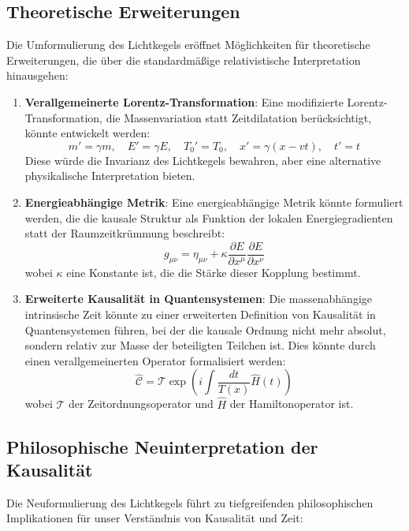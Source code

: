 \documentclass[a4paper,12pt]{article}
\newcommand{\Tfield}{T(x)}
\begin{document}
	\subsection{Theoretische Erweiterungen}
	Die Umformulierung des Lichtkegels eröffnet Möglichkeiten für theoretische Erweiterungen, die über die standardmäßige relativistische Interpretation hinausgehen:
	\begin{enumerate}
		\item \textbf{Verallgemeinerte Lorentz-Transformation}: Eine modifizierte Lorentz-Transformation, die Massenvariation statt Zeitdilatation berücksichtigt, könnte entwickelt werden:
		\begin{equation}
			m' = \gamma m, \quad E' = \gamma E, \quad T_0' = T_0, \quad x' = \gamma(x - vt), \quad t' = t
		\end{equation}
		Diese würde die Invarianz des Lichtkegels bewahren, aber eine alternative physikalische Interpretation bieten.
		\item \textbf{Energieabhängige Metrik}: Eine energieabhängige Metrik könnte formuliert werden, die die kausale Struktur als Funktion der lokalen Energiegradienten statt der Raumzeitkrümmung beschreibt:
		\begin{equation}
			g_{\mu\nu} = \eta_{\mu\nu} + \kappa \frac{\partial E}{\partial x^\mu}\frac{\partial E}{\partial x^\nu}
		\end{equation}
		wobei \( \kappa \) eine Konstante ist, die die Stärke dieser Kopplung bestimmt.
		\item \textbf{Erweiterte Kausalität in Quantensystemen}: Die massenabhängige intrinsische Zeit könnte zu einer erweiterten Definition von Kausalität in Quantensystemen führen, bei der die kausale Ordnung nicht mehr absolut, sondern relativ zur Masse der beteiligten Teilchen ist. Dies könnte durch einen verallgemeinerten Operator formalisiert werden:
		\begin{equation}
			\hat{\mathcal{C}} = \mathcal{T} \exp\left(i\int \frac{dt}{\Tfield} \hat{H}(t)\right)
		\end{equation}
		wobei \( \mathcal{T} \) der Zeitordnungsoperator und \( \hat{H} \) der Hamiltonoperator ist.
	\end{enumerate}
	
	\subsection{Philosophische Neuinterpretation der Kausalität}
	Die Neuformulierung des Lichtkegels führt zu tiefgreifenden philosophischen Implikationen für unser Verständnis von Kausalität und Zeit:
	
\end{document}
